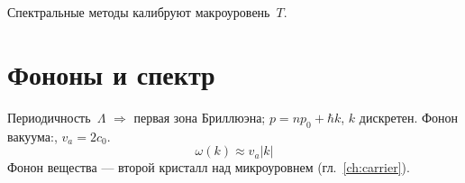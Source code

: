 Спектральные методы калибруют макроуровень~$T$.

\section{Фононы и спектр}

Периодичность~$\Lambda$ $\Rightarrow$ первая зона Бриллюэна;
$p=n p_0+\hbar k$, $k$ дискретен.
Фонон вакуума:, $v_a=2c_0$.
\[
\omega(k)\approx v_a|k|
\]
Фонон вещества --- второй кристалл над микроуровнем (гл.~\ref{ch:carrier}).
